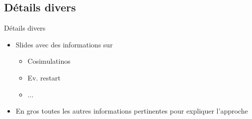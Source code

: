 \subsection{Détails divers}
\label{sec:Détails divers}

\begin{frame}[c]{Détails divers}
  \begin{itemize}
  \item Slides avec des informations sur
    \begin{itemize}
    \item Cosimulatinos
    \item Ev. restart
    \item ...
    \end{itemize}
  \item En gros toutes les autres informations pertinentes pour expliquer l'approche
  \end{itemize}
\end{frame}